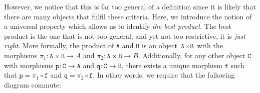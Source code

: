 \documentclass[12pt,twoside,maitrise]{dms}
\theoremstyle{definition}
\numberwithin{equation}{section}
\numberwithin{table}{chapter}
\numberwithin{figure}{chapter}
\newcommand\id[1] {\texttt{#1}}
\begin{document}
However, we notice that this is far too general of a definition since it is
likely that there are many objects that fulfil these criteria. Here, we
introduce the notion of a universal property which allows us to identify
\emph{the best product}. The best product is the one that is not too general,
and yet not too restrictive, it is \emph{just right}. More formally, the product
of $\id{A}$ and $\id{B}$ is an object $\id{A} \times \id{B}$ with the morphisms
$\pi_1 : \id{A} \times \id{B} \rightarrow A$ and $\pi_2 : \id{A} \times \id{B}
\rightarrow B$. Additionally, for any other object $\id{C}$ with morphisms
$\id{p} : \id{C} \rightarrow \id{A}$ and $\id{q} : \id{C} \rightarrow \id{B}$,
there exists a unique morphism $\id{f}$ such that $\id{p} = \pi_1 \circ \id{f}$
and $\id{q} = \pi_2 \circ \id{f}$. In other words, we require that the following
diagram commute:
\end{document}
